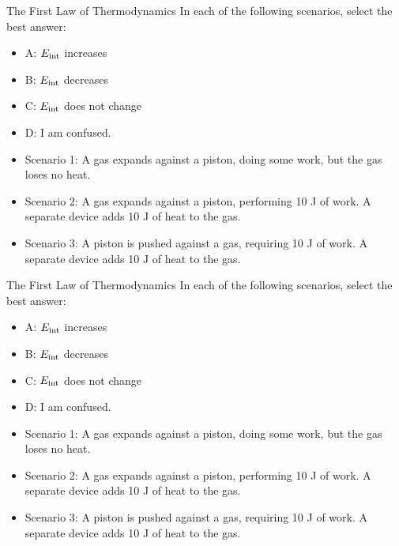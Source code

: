 \documentclass{beamer}
\begin{document}
\begin{frame}{The First Law of Thermodynamics}
In each of the following scenarios, select the best answer:
\small
\begin{itemize}
\item A: $E_{\rm int}$ increases
\item B: $E_{\rm int}$ decreases
\item C: $E_{\rm int}$ does not change
\item D: I am confused.
\end{itemize}
\small
\begin{itemize}
\item Scenario 1: \alert{A gas expands against a piston, doing some work, but the gas loses no heat.}
\item Scenario 2: A gas expands against a piston, performing 10 J of work.  A separate device adds 10 J of heat to the gas.
\item Scenario 3: A piston is pushed against a gas, requiring 10 J of work.  A separate device adds 10 J of heat to the gas.
\end{itemize}
\end{frame}

\begin{frame}{The First Law of Thermodynamics}
In each of the following scenarios, select the best answer:
\small
\begin{itemize}
\item A: $E_{\rm int}$ increases
\item B: $E_{\rm int}$ decreases
\item C: $E_{\rm int}$ does not change
\item D: I am confused.
\end{itemize}
\small
\begin{itemize}
\item Scenario 1: A gas expands against a piston, doing some work, but the gas loses no heat.
\item Scenario 2: \alert{A gas expands against a piston, performing 10 J of work.  A separate device adds 10 J of heat to the gas.}
\item Scenario 3: A piston is pushed against a gas, requiring 10 J of work.  A separate device adds 10 J of heat to the gas.
\end{itemize}
\end{frame}
\end{document}
